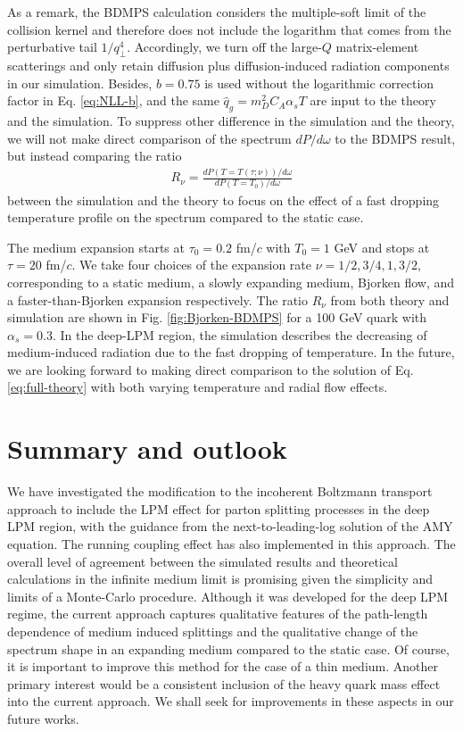 \documentclass[aps, prc, reprint, amsmath, groupedaddress, nofootinbib]{revtex4-1}
\begin{document}
As a remark, the BDMPS calculation considers the multiple-soft limit of the collision kernel and therefore does not include the logarithm that comes from the perturbative tail $1/q_\perp^4$. 
Accordingly, we turn off the large-$Q$ matrix-element scatterings and only retain diffusion plus diffusion-induced radiation components in our simulation.
Besides, $b=0.75$ is used without the logarithmic correction factor in Eq. \ref{eq:NLL-b}, and the same $\hat{q}_g = m_D^2 C_A\alpha_s T$ are input to the theory and the simulation.
To suppress other difference in the simulation and the theory, we will not make direct comparison of the spectrum $dP/d\omega$ to the BDMPS result, but instead comparing the ratio
\begin{eqnarray}
R_\nu = \frac{dP(T=T(\tau;\nu))/d\omega}{dP(T=T_0)/d\omega}
\end{eqnarray}
between the simulation and the theory to focus on the effect of a fast dropping temperature profile on the spectrum compared to the static case.

The medium expansion starts at $\tau_0=0.2$ fm/$c$ with $T_0=1$ GeV and stops at $\tau = 20$ fm/$c$.
We take four choices of the expansion rate $\nu = 1/2, 3/4, 1, 3/2$, corresponding to a static medium, a slowly expanding medium, Bjorken flow, and a faster-than-Bjorken expansion respectively.
The ratio $R_\nu$ from both theory and simulation are shown in Fig. \ref{fig:Bjorken-BDMPS} for a 100 GeV quark with $\alpha_s=0.3$.
In the deep-LPM region, the simulation describes the decreasing of medium-induced radiation due to the fast dropping of temperature.
In the future, we are looking forward to making direct comparison to the solution of Eq. \ref{eq:full-theory} with both varying temperature and radial flow effects.

\section{Summary and outlook}\label{section:summary}
We have investigated the modification to the incoherent Boltzmann transport approach to include the LPM effect for parton splitting processes in the deep LPM region, with the guidance from the next-to-leading-log solution of the AMY equation.
The running coupling effect has also implemented in this approach.
The overall level of agreement between the simulated results and theoretical calculations in the infinite medium limit is promising given the simplicity and limits of a Monte-Carlo procedure. 
Although it was developed for the deep LPM regime, the current approach captures qualitative features of the path-length dependence of medium induced splittings and the qualitative change of the spectrum shape in an expanding medium compared to the static case.
Of course, it is important to improve this method for the case of a thin medium.
Another primary interest would be a consistent inclusion of the heavy quark mass effect into the current approach.
We shall seek for improvements in these aspects in our future works.
\end{document}
